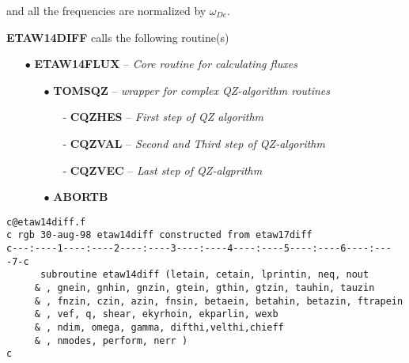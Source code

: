 and all the frequencies are normalized by $ \omega_{De} $.
\vspace{0.5cm}
{\parindent 0cm

 {\bf ETAW14DIFF} calls the following routine(s)}
\begin{itemize}
   \item[{\large$\bullet$}] {\bf ETAW14FLUX} -- {\em Core routine for calculating fluxes } 
   \begin{itemize}
       \item[{\normalsize $\bullet$}]
             {\bf TOMSQZ} -- {\em wrapper for complex QZ-algorithm routines} 
        \begin{itemize}
           \item[-]{\bf CQZHES} -- {\em First step of QZ algorithm}
           \item[-]{\bf CQZVAL} -- {\em Second and Third step of QZ-algorithm}
           \item[-] {\bf CQZVEC} -- {\em Last step of QZ-algprithm}
       \end{itemize}
       \item [{\normalsize$\bullet$}]{\bf ABORTB}
   \end{itemize}
\end{itemize}
\newpage
\begin{verbatim}
c@etaw14diff.f
c rgb 30-aug-98 etaw14diff constructed from etaw17diff
c---:----1----:----2----:----3----:----4----:----5----:----6----:----7-c
      subroutine etaw14diff (letain, cetain, lprintin, neq, nout
     & , gnein, gnhin, gnzin, gtein, gthin, gtzin, tauhin, tauzin
     & , fnzin, czin, azin, fnsin, betaein, betahin, betazin, ftrapein
     & , vef, q, shear, ekyrhoin, ekparlin, wexb
     & , ndim, omega, gamma, difthi,velthi,chieff 
     & , nmodes, perform, nerr )
c
\end{verbatim}
\renewcommand{\arraystretch}{1.0}
